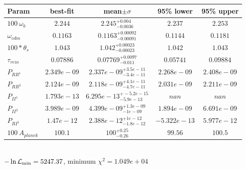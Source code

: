 \begin{tabular}{|l|c|c|c|c|} 
 \hline 
Param & best-fit & mean$\pm\sigma$ & 95\% lower & 95\% upper \\ \hline 
$100~\omega_{b }$ &$2.244$ & $2.245_{-0.0036}^{+0.004}$ & $2.237$ & $2.253$ \\ 
$\omega_{cdm }$ &$0.1163$ & $0.1163_{-0.00091}^{+0.00092}$ & $0.1144$ & $0.1181$ \\ 
$100*\theta_{s }$ &$1.043$ & $1.042_{-0.00023}^{+0.00023}$ & $1.042$ & $1.043$ \\ 
$\tau_{reio }$ &$0.07886$ & $0.07769_{-0.011}^{+0.0097}$ & $0.05741$ & $0.09884$ \\ 
$P_{{RR}^1 }$ &$2.349e-09$ & $2.337e-09_{-3.4e-11}^{+3.5e-11}$ & $2.268e-09$ & $2.408e-09$ \\ 
$P_{{RR}^2 }$ &$2.124e-09$ & $2.118e-09_{-4.7e-11}^{+4.1e-11}$ & $2.031e-09$ & $2.211e-09$ \\ 
$P_{{II}^1 }$ &$1.793e-13$ & $6.295e-13_{-5.9e-13}^{+-5.2e-15}$ & $nan$ & $nan$ \\ 
$P_{{II}^2 }$ &$3.989e-09$ & $4.399e-09_{-1e-09}^{+1.3e-09}$ & $1.894e-09$ & $6.691e-09$ \\ 
$P_{{RI}^1 }$ &$1.47e-12$ & $2.388e-12_{-1.8e-12}^{+1e-12}$ & $-5.322e-13$ & $5.977e-12$ \\ 
$100~A_{planck }$ &$100.1$ & $100_{-0.26}^{+0.25}$ & $99.56$ & $100.5$ \\ 
\hline 
 \end{tabular} \\ 
$-\ln{\cal L}_\mathrm{min} =5247.37$, minimum $\chi^2=1.049e+04$ \\ 
